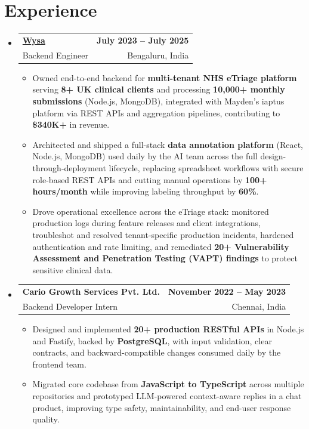 \documentclass[letterpaper,10pt]{article}
\makeatletter
\newcommand{\resumeItem}[1]{
  \item\small{#1\vspace{-1pt}}
}
\newcommand{\resumeSubheading}[4]{
  \vspace{1pt}\item
    \begin{tabular*}{0.985\textwidth}[t]{l@{\extracolsep{\fill}}r}
      \textbf{#1} & \textbf{\small #2} \\
      {\small\color{ResumeSlate} #3} & {\small\color{ResumeSlate} #4} \\
    \end{tabular*}\vspace{-6pt}
}
\newcommand{\resumeSubHeadingListStart}{\begin{itemize}[leftmargin=0.0in, label={}, itemsep=2pt, topsep=2pt]}
\newcommand{\resumeSubHeadingListEnd}{\end{itemize}}
\newcommand{\resumeItemListStart}{\begin{itemize}[leftmargin=0.18in, itemsep=2pt, topsep=1pt]}
\newcommand{\resumeItemListEnd}{\end{itemize}\vspace{-4pt}}
\makeatother
\begin{document}
\section{Experience}
\resumeSubHeadingListStart
  \resumeSubheading
    {\href{https://www.wysa.io}{Wysa}}{July 2023 -- July 2025}
    {Backend Engineer}{Bengaluru, India}
    \resumeItemListStart
      \resumeItem{Owned end-to-end backend for \textbf{multi-tenant NHS eTriage platform} serving \textbf{8+ UK clinical clients} and processing \textbf{10{,}000+ monthly submissions} (Node.js, MongoDB), integrated with Mayden's iaptus platform via REST APIs and aggregation pipelines, contributing to \textbf{\$340K+} in revenue.}
      \resumeItem{Architected and shipped a full-stack \textbf{data annotation platform} (React, Node.js, MongoDB) used daily by the AI team across the full design-through-deployment lifecycle, replacing spreadsheet workflows with secure role-based REST APIs and cutting manual operations by \textbf{100+ hours/month} while improving labeling throughput by \textbf{60\%}.}
      \resumeItem{Drove operational excellence across the eTriage stack: monitored production logs during feature releases and client integrations, troubleshot and resolved tenant-specific production incidents, hardened authentication and rate limiting, and remediated \textbf{20+ Vulnerability Assessment and Penetration Testing (VAPT) findings} to protect sensitive clinical data.}
    \resumeItemListEnd
  \resumeSubheading
    {Cario Growth Services Pvt. Ltd.}{November 2022 -- May 2023}
    {Backend Developer Intern}{Chennai, India}
    \resumeItemListStart
      \resumeItem{Designed and implemented \textbf{20+ production RESTful APIs} in Node.js and Fastify, backed by \textbf{PostgreSQL}, with input validation, clear contracts, and backward-compatible changes consumed daily by the frontend team.}
      \resumeItem{Migrated core codebase from \textbf{JavaScript to TypeScript} across multiple repositories and prototyped LLM-powered context-aware replies in a chat product, improving type safety, maintainability, and end-user response quality.}
    \resumeItemListEnd
\resumeSubHeadingListEnd
\vspace{-4pt}
\end{document}
